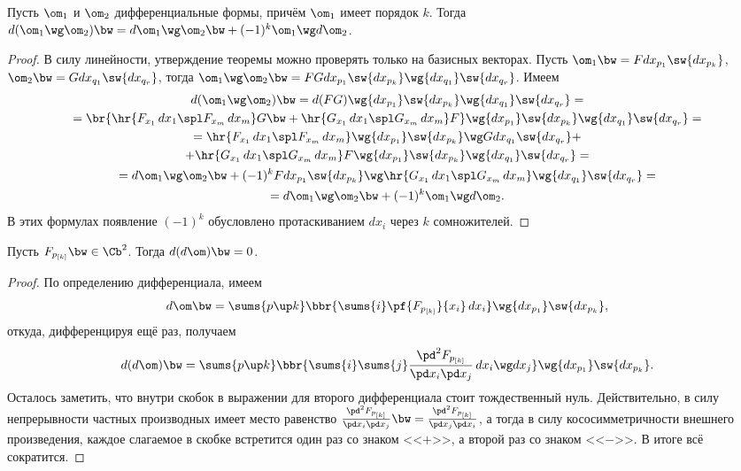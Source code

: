 \documentclass[a4paper]{article}
\newcommand{\pv}[1]{{p_{[#1]}}}
\newcommand{\di}[3]{{d {#1}_{#2_{#3}}}}
\newcommand{\pdf}[3]{\frac{\pd^2 #1}{\pd #2 \pd #3}}
\begin{document}
\begin{theorem}
Пусть $\om_1$ и $\om_2$ дифференциальные формы, причём $\om_1$ имеет порядок $k$. Тогда $d(\om_1\wg
\om_2) \bw= d \om_1 \wg \om_2 \bw+ (-1)^k \om_1\wg d \om_2$.
\end{theorem}
\begin{proof}
В силу линейности, утверждение теоремы можно проверять только на базисных векторах. Пусть
$\om_1 \bw= F\di xp1 \sw \di xpk$, $\om_2 \bw= G\di xq1 \sw \di xqr$, тогда $\om_1\wg \om_2 \bw=
FG\di xp1\sw \di xpk\wg \di xq1\sw \di xqr$.
Имеем
\begin{multline*}
d(\om_1\wg \om_2) \bw= d(F G)\wg\di xp1 \sw \di xpk\wg \di xq1\sw \di xqr =\\=
\br{\hr{F_{x_1}\,d x_1 \spl F_{x_m}\,d x_m} G \bw+ \hr{G_{x_1}\,d x_1 \spl G_{x_m}\,d x_m}F}
\wg\di xp1\sw \di xpk\wg \di xq1\sw \di xqr=\\=
\hr{F_{x_1}\,d x_1 \spl F_{x_m}\,d x_m} \wg\di xp1\sw \di xpk\wg G \di xq1\sw \di xqr +\\+
\hr{G_{x_1}\,d x_1 \spl G_{x_m}\,d x_m}F \wg\di xp1\sw \di xpk\wg \di xq1\sw \di xqr =\\=
d \om_1 \wg \om_2 \bw+ (-1)^k F \di xp1\sw \di xpk \wg \hr{G_{x_1}\,d x_1 \spl G_{x_m}\,d x_m} \wg \di xq1\sw \di xqr =\\=
d \om_1 \wg \om_2 \bw+ (-1)^k \om_1 \wg d \om_2.
\end{multline*}
В этих формулах появление $(-1)^k$ обусловлено протаскиванием $d x_i$ через $k$ сомножителей.
\end{proof}

\begin{theorem}
Пусть $F_{\pv k} \bw\in \Cb^2$. Тогда $d(d \om) \bw= 0$.
\end{theorem}
\begin{proof}
По определению дифференциала, имеем
$$d \om \bw= \sums{p\up k} \bbr{\sums{i}\pf{F_{\pv k}}{x_i}\,d x_i }\wg \di xp1 \sw \di xpk,$$
откуда, дифференцируя ещё раз, получаем
$$d(d \om) \bw= \sums{p\up k}\bbr{\sums{i}\sums{j}\pdf{F_{\pv k}}{x_i}{x_j}\,d x_i\wg d x_j}\wg \di xp1 \sw \di xpk.$$
Осталось заметить, что внутри скобок в выражении для второго дифференциала стоит тождественный нуль. Действительно,
в силу непрерывности частных производных имеет место равенство $\pdf{F_{\pv k}}{x_i}{x_j} \bw= \pdf{F_{\pv k}}{x_j}{x_i}$,
а тогда в силу кососимметричности внешнего произведения, каждое слагаемое в скобке встретится один раз со знаком <<$+$>>,
а второй раз со знаком <<$-$>>. В итоге всё сократится.
\end{proof}
\end{document}

